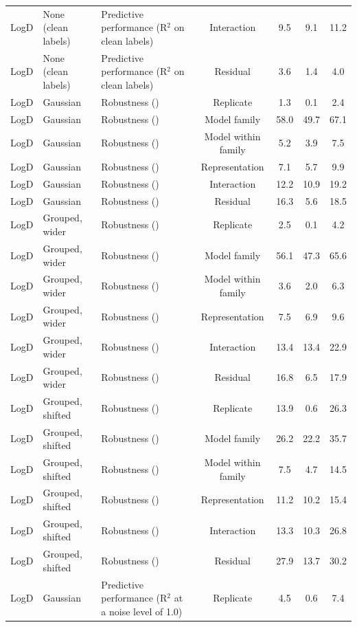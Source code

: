 \begin{landscape}
{\begin{longtable}{lllcccc}
LogD & None (clean labels) & Predictive performance (R$^2$ on clean labels) & Interaction & 9.5 & 9.1 & 11.2 \\
LogD & None (clean labels) & Predictive performance (R$^2$ on clean labels) & Residual & 3.6 & 1.4 & 4.0 \\
LogD & Gaussian & Robustness (\aucnorm{}) & Replicate & 1.3 & 0.1 & 2.4 \\
LogD & Gaussian & Robustness (\aucnorm{}) & Model family & 58.0 & 49.7 & 67.1 \\
LogD & Gaussian & Robustness (\aucnorm{}) & Model within family & 5.2 & 3.9 & 7.5 \\
LogD & Gaussian & Robustness (\aucnorm{}) & Representation & 7.1 & 5.7 & 9.9 \\
LogD & Gaussian & Robustness (\aucnorm{}) & Interaction & 12.2 & 10.9 & 19.2 \\
LogD & Gaussian & Robustness (\aucnorm{}) & Residual & 16.3 & 5.6 & 18.5 \\
LogD & Grouped, wider & Robustness (\aucnorm{}) & Replicate & 2.5 & 0.1 & 4.2 \\
LogD & Grouped, wider & Robustness (\aucnorm{}) & Model family & 56.1 & 47.3 & 65.6 \\
LogD & Grouped, wider & Robustness (\aucnorm{}) & Model within family & 3.6 & 2.0 & 6.3 \\
LogD & Grouped, wider & Robustness (\aucnorm{}) & Representation & 7.5 & 6.9 & 9.6 \\
LogD & Grouped, wider & Robustness (\aucnorm{}) & Interaction & 13.4 & 13.4 & 22.9 \\
LogD & Grouped, wider & Robustness (\aucnorm{}) & Residual & 16.8 & 6.5 & 17.9 \\
LogD & Grouped, shifted & Robustness (\aucnorm{}) & Replicate & 13.9 & 0.6 & 26.3 \\
LogD & Grouped, shifted & Robustness (\aucnorm{}) & Model family & 26.2 & 22.2 & 35.7 \\
LogD & Grouped, shifted & Robustness (\aucnorm{}) & Model within family & 7.5 & 4.7 & 14.5 \\
LogD & Grouped, shifted & Robustness (\aucnorm{}) & Representation & 11.2 & 10.2 & 15.4 \\
LogD & Grouped, shifted & Robustness (\aucnorm{}) & Interaction & 13.3 & 10.3 & 26.8 \\
LogD & Grouped, shifted & Robustness (\aucnorm{}) & Residual & 27.9 & 13.7 & 30.2 \\
LogD & Gaussian & Predictive performance (R$^2$ at a noise level of 1.0) & Replicate & 4.5 & 0.6 & 7.4 \\

\end{longtable}}
\end{landscape}
